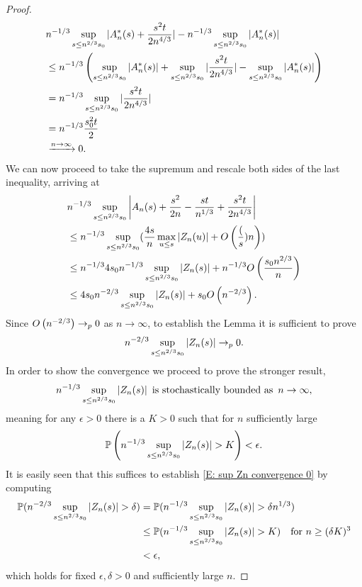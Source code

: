 \begin{proof}
    \begin{align*}
    &n^{-1 / 3}\sup_{s \leq n^{2 / 3} s_0 } | A^*_n(s) + \frac{s^2t}{2n^{4 / 3}}  | - n^{-1 / 3}\sup_{s \leq n^{2 / 3} s_0 } | A^*_n(s) | \\
    &\leq n^{-1 / 3} \left( \sup_{s \leq n^{2 / 3} s_0 } | A^*_n(s) | + \sup_{s \leq n^{2 / 3} s_0 } |\frac{s^2t}{2n^{4 / 3}}|  - \sup_{s \leq n^{2 / 3} s_0 } | A^*_n(s) | \right) \\
    &= n^{-1 / 3} \sup_{s \leq n^{2 / 3} s_0 } |\frac{s^2t}{2n^{4 / 3}}| \\
    &= n^{-1 / 3} \frac{s_0^2t}{2} \\
    &\xrightarrow{n \rightarrow \infty} 0.
    \end{align*}
    We can now proceed to take the supremum and rescale both sides of the last inequality, arriving at
    \begin{equation}
    \begin{aligned}
    &n^{-1 / 3} \sup_{s \leq n^{2 / 3} s_0 } \left| A_n(s) + \frac{s^2}{2n} - \frac{st}{n^{1 / 3}}  + \frac{s^2t}{2n^{4 / 3}}  \right| \\
    &\leq n^{-1 / 3} \sup_{s \leq n^{2 / 3} s_0 } (\frac{4s}{n} \max_{u \leq s} |Z_n(u)| + O\left(\frac(s){n}\right)) \\
    &\leq n^{-1 / 3} 4 s_0 n^{-1 / 3} \sup_{s \leq n^{2 / 3} s_0 } |Z_n(s)| + n^{-1 / 3}O\left(\frac{s_0 n^{2 / 3}}{n}\right) \\
    &\leq 4 s_0 n^{-2 / 3} \sup_{s \leq n^{2 / 3} s_0 } |Z_n(s)| + s_0 O\left(n^{-2 / 3}\right).
    \end{aligned}
    \end{equation}
    Since $O\left(n^{-2 / 3}\right) \rightarrow_p 0$ as $n \rightarrow \infty$, to establish the Lemma it is sufficient to prove
    \begin{equation} \label{E: sup Zn convergence 0}
    n^{-2 / 3} \sup_{s \leq n^{2 / 3} s_0 } |Z_n(s)| \rightarrow_p 0.
    \end{equation}
    In order to show the convergence we proceed to prove the stronger result,
    \begin{equation}
    n^{-1/3} \sup_{s \leq n^{2 / 3} s_0 } |Z_n(s)| 
    \enspace \text{is stochastically bounded as} \enspace n \rightarrow \infty ,
    \end{equation} 
    meaning for any  $ \epsilon > 0 $  there is a $ K > 0 $
    such that for $n$ sufficiently large 
    \begin{equation} \label{E: stoch bounded}
    \mathbb{P}\left( n^{-1/3} \sup_{s \leq n^{2 / 3} s_0 } |Z_n(s)| > K \right) < \epsilon. 
    \end{equation}
    It is easily seen that this suffices to establish \eqref{E: sup Zn convergence 0} by computing
    \begin{equation*}
    \begin{aligned}
    \mathbb{P}( n^{-2 / 3} \sup_{s \leq n^{2 / 3} s_0 } |Z_n(s)| > \delta)
	&= \mathbb{P}( n^{-1 / 3} \sup_{s \leq n^{2 / 3} s_0 } |Z_n(s)| > \delta n^{1 / 3} ) \\
	&\leq \mathbb{P}( n^{-1 / 3} \sup_{s \leq n^{2 / 3} s_0 } |Z_n(s)| > K) \quad \text{for $n \geq (\delta K)^3$} \\
	&< \epsilon,
    \end{aligned}
    \end{equation*}
    which holds for fixed $\epsilon, \delta > 0$ and sufficiently large $n$.
    

\end{proof}
